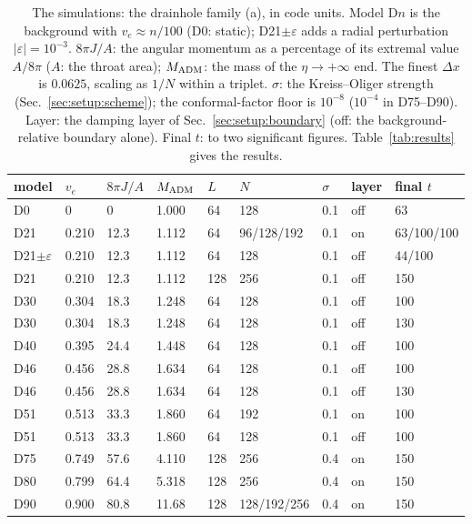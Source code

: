 \documentclass[twocolumn,floatfix,aps,prd,superscriptaddress,nofootinbib]{revtex4-2}
\begin{document}
\begin{table}[t]
\caption{The simulations: the drainhole family (a), in code units. Model D$n$ is the background with $v_e\approx n/100$ (D0: static); D21$\pm\varepsilon$ adds a radial perturbation $|\varepsilon|=10^{-3}$. $8\pi J/A$: the angular momentum as a percentage of its extremal value $A/8\pi$ ($A$: the throat area); $M_{\rm ADM}$: the mass of the $\eta\to+\infty$ end. The finest $\Delta x$ is $0.0625$, scaling as $1/N$ within a triplet. $\sigma$: the Kreiss--Oliger strength (Sec.~\ref{sec:setup:scheme}); the conformal-factor floor is $10^{-8}$ ($10^{-4}$ in D75--D90). Layer: the damping layer of Sec.~\ref{sec:setup:boundary} (off: the background-relative boundary alone). Final $t$: to two significant figures. Table~\ref{tab:results} gives the results.}
\label{tab:ladder}
\scriptsize
\setlength{\tabcolsep}{1.5pt}
\begin{ruledtabular}
\begin{tabular}{lllllllll}
model & $v_e$ & $8\pi J/A$ & $M_{\rm ADM}$ & $L$ & $N$ & $\sigma$ & layer & final $t$ \\
\hline
D0 & 0 & 0 & 1.000 & 64 & 128 & 0.1 & off & 63 \\
D21 & 0.210 & 12.3 & 1.112 & 64 & 96/128/192 & 0.1 & on & 63/100/100 \\
D21$\pm\varepsilon$ & 0.210 & 12.3 & 1.112 & 64 & 128 & 0.1 & off & 44/100 \\
D21 & 0.210 & 12.3 & 1.112 & 128 & 256 & 0.1 & off & 150 \\
D30 & 0.304 & 18.3 & 1.248 & 64 & 128 & 0.1 & off & 100 \\
D30 & 0.304 & 18.3 & 1.248 & 64 & 128 & 0.1 & off & 130 \\
D40 & 0.395 & 24.4 & 1.448 & 64 & 128 & 0.1 & off & 100 \\
D46 & 0.456 & 28.8 & 1.634 & 64 & 128 & 0.1 & off & 100 \\
D46 & 0.456 & 28.8 & 1.634 & 64 & 128 & 0.1 & off & 130 \\
D51 & 0.513 & 33.3 & 1.860 & 64 & 192 & 0.1 & on & 100 \\
D51 & 0.513 & 33.3 & 1.860 & 64 & 128 & 0.1 & off & 100 \\
D75 & 0.749 & 57.6 & 4.110 & 128 & 256 & 0.4 & on & 150 \\
D80 & 0.799 & 64.4 & 5.318 & 128 & 256 & 0.4 & on & 150 \\
D90 & 0.900 & 80.8 & 11.68 & 128 & 128/192/256 & 0.4 & on & 150 \\
\end{tabular}
\end{ruledtabular}
\end{table}
\end{document}
